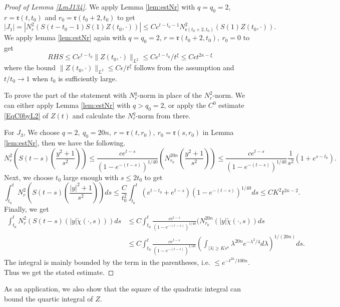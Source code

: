\documentclass[11pt]{amsart}
\numberwithin{equation}{section}
\numberwithin{equation}{section}
\newcommand{\mtr}{\mathfrak{r}}
\begin{document}
	
	\begin{proof}[Proof of Lemma \ref{LmJ134}]
		We apply Lemma \ref{lem:estNr} with $q=q_0=2$, $r=\mtr(t,t_0)$ and $r_0=\mtr(t_0+2,t_0)$ to get
		$$|J_1|=|N_r^2(S(t-t_0-1)S(1)Z( t_0,\cdot))|\leq Ce^{t-t_0-1} N^2_{\mtr(t_0+2,t_0)}(S(1)Z(t_0,\cdot)).$$
		We apply lemma \ref{lem:estNr} again with $q=q_0=2$, $r=\mtr(t_0+2,t_0),\ r_0=0$ to get 
		$$RHS\leq Ce^{t-t_0}\|Z(t_0,\cdot)\|_{L^2}\leq Ce^{t-t_0}/t^\xi\leq C\epsilon  t^{2\kappa-\xi} $$
		where the bound $\|Z(t_0,\cdot)\|_{L^2}\leq C \epsilon/t^\xi$ follows from the assumption and $t/t_0\to1$ when $t_0$ is sufficiently large. 
		
		To prove the part of the statement with $N^q_r$-norm in place of the $N^2_r$-norm. We can either apply Lemma \ref{lem:estNr} with $q>q_0=2$, or apply the $C^0$ estimate \eqref{EqC0byL2} of $Z(t)$ and calculate the $N^q_r$-norm from there. 
		
		For $J_3$, We  choose $q=2,\ q_0=20n,\ r=\mtr(t,r_0),\ r_0=\mtr(s,r_0)$ in Lemma \ref{lem:estNr}, then we have the following.
		$$N_r^2\left(S(t-s)\left(\frac{y^2+1}{s^2}\right)\right)\leq \frac{c e^{t-s}}{(1-e^{-(t-s)})^{1/40}}\left(N^{20n}_{r_0}\left(\frac{y^2+1}{s^2}\right)\right)\leq \frac{c e^{t-s}}{(1-e^{-(t-s)})^{1/40}} \frac{1}{s^2}(1+e^{s-t_0}).$$
		Next, we choose $t_0$ large enough with $s\leq 2t_0$ to get 
		$$\int_{t_0}^tN^2_r\left(S(t-s)(\frac{|y|^2+1}{s^2})\right)ds\leq \frac{C}{t_0^2}\int_{t_0}^t (e^{t-t_0}+e^{t-s})(1-e^{-(t-s)})^{1/40}ds\leq 
		C K^2 t^{2\kappa-2}. $$
		Finally, we get
		\begin{equation*}
			\begin{aligned}
				\int_{t_0}^tN^2_r\left(S(t-s)(|y|\check\chi(\cdot,s))\right)ds&\leq C\int_{t_0}^t \frac{c e^{t-s}}{(1-e^{-(r-s)})^{1/40}}(N^{20n}_{r_0}(|y|\check\chi(\cdot, s))ds\\
				&\leq C\int_{t_0}^t \frac{c e^{t-s}}{(1-e^{-(t-s)})^{1/40}}\left(\int_{|\lambda|\geq K s^{\kappa}}\lambda^{20n} e^{-\lambda^2/4}d\lambda\right)^{1/(20n)}ds.         
			\end{aligned}
		\end{equation*}
		The integral is mainly bounded by the term in the parentheses, i.e. $\leq e^{-t^{2\kappa}/100n}$. Thus we get the stated estimate.
	\end{proof}
	
	As an application, we also show that the square of the quadratic integral can bound the quartic integral of $Z$.
	
\end{document}

